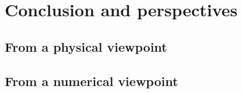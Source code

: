 \chapter{Conclusion and perspectives}

\section{From a physical viewpoint}
\blindtext

\section{From a numerical viewpoint}
\blindtext

